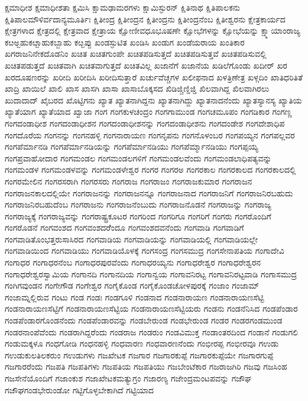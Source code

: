 {ಕ್ಷಮಾಧೀಶ
ಕ್ಷಮಾಧೀಶತಾ
ಕ್ಷಮಿಸಿ
ಕ್ಷಾಮಢಾಮರಗಳು
ಕ್ಷಾಮಿಸ್ಫುರನ್
ಕ್ಷಿತಿನಾಥ
ಕ್ಷಿತಿಪಾಲಕನು
ಕ್ಷಿತಿಪಾಲಮೌಳಿರ್ವದಾನ್ಯಮೂರ್ತಿಃ
ಕ್ಷಿತೀಂದ್ರ
ಕ್ಷಿತೀಂದ್ರನ
ಕ್ಷಿತೀಂದ್ರನು
ಕ್ಷಿತೀಂದ್ರನೆಂಬ
ಕ್ಷಿತೀಶ್ವರನು
ಕ್ಷೇತ್ರಕಾರ್ಯದ
ಕ್ಷೇತ್ರಗಳಾದ
ಕ್ಷೇತ್ರದಲ್ಲಿ
ಕ್ಷೇತ್ರವಾದ
ಕ್ಷೇತ್ರಾಯ
ಕ್ಷೋಣೀವಧೂಭೂಷಣೇ
ಕ್ಷೋಭೆಗಳನ್ನು
ಕ್ಷೋಭೆಯನ್ನು
ಕ್ಷ್ಮಾಯಾಂರಾಜ್ಯ
ಕೞಅ್ಬಹುಕೞ್ಬಾಹುಕಬ್ಬಾಹು
ಕೞ್ಬಪ್ಪು
ಖಂಡಸ್ಫುಟಿತ
ಖಂಡಿಸಿ
ಖಂಡುಗ
ಖಂಡೆಯರಾಯ
ಖಂತಿಕಾರ
ಖಗರಾಜನಿನೇಕದೊಡನಿಂ
ಖಚಿತ
ಖಚಿತಗುಂಪೇ
ಖಚಿತಪಡಿಸುತ್ತದೆ
ಖಚಿತಪಡಿಸುತ್ತವೆ
ಖಚಿತಪಡಿಸುವಲ್ಲಿ
ಖಚಿತಪಡುತ್ತದೆ
ಖಚಿತವಾಗಿ
ಖಚಿತವಾಗುತ್ತದೆ
ಖಚಿತವಿಲ್ಲ
ಖಜಾನೆಗೆ
ಖಜಾನೆಯ
ಖಡಿಲೆಗೊಂಡು
ಖದೀರ್
ಖರ
ಖರದೂಷಣರನ್ನು
ಖರೀದಿ
ಖರೀದಿಸಿ
ಖರೀದಿಸುತ್ತಾರೆ
ಖರ್ಚುವೆಚ್ಚಗಳ
ಖಲೀಫನಾದ
ಖಳತ್ರಿಣೇತ್ರ
ಖಳ್ಗದಿಂ
ಖಾತಿಧರಿತಿತೆ
ಖಾದ್ರಿ
ಖಾಯಿಲೆ
ಖಾಲಿ
ಖಾಸ
ಖಾಸಗಿ
ಖಾಸಾ
ಖಾಸಾಬೊಕ್ಕಸದ
ಖಿಡಿಜ್ಚಿಣ್ಡಿಜ್ಡಿ
ಖಿಲವಾಗಿದ್ದ
ಖಿಲವಾಗಿರಲು
ಖುದಾದಾದ್
ಖೈಬರದ
ಖೊಟ್ಟಿಗನು
ಖ್ಯಾತ
ಖ್ಯಾತನಾಗಿದ್ದನು
ಖ್ಯಾತನಾಗಿದ್ದು
ಖ್ಯಾತನಾದನೆಂದು
ಖ್ಯಾತಸ್ಯಾನಸ್ಯ
ಖ್ಯಾತಿಯ
ಖ್ಯಾತೆಯಾಗ
ಖ್ಯಾತೆಯಾದ
ಖ್ವಾಜಾ
ಗಂಗ
ಗಂಗಕುಳಚಂದ್ರಂ
ಗಂಗಗಾಮುಂಡ
ಗಂಗಚಮೂಪಂ
ಗಂಗಡಿಕಾರ
ಗಂಗಣ್ಣ
ಗಂಗದಂಡಾಧೀಶ
ಗಂಗದಂಡಾಧೀಶನ
ಗಂಗದಂಡಾಧೀಶನನ್ನು
ಗಂಗದಂಡಾಧೀಶನು
ಗಂಗದಂಡೇಶ
ಗಂಗದೇಶಾಧಿಪ
ಗಂಗದೊರೆಯ
ಗಂಗನನ್ನು
ಗಂಗನಹಳ್ಳಿ
ಗಂಗನಾರಾಯಣ
ಗಂಗನೃಪನು
ಗಂಗನೊಳಂಬರ
ಗಂಗಪಯ್ಯನ
ಗಂಗಪಲ್ಲವರ
ಗಂಗಪೆರ್ಮಾನಡಿ
ಗಂಗಪೆರ್ಮಾನಡಿಯನ್ನು
ಗಂಗಪೆರ್ಮಾನಡಿಯು
ಗಂಗಪೆರ್ಮ್ಮಾನಡಿಯು
ಗಂಗಪ್ಪಯ್ಯ
ಗಂಗಪ್ರವಾಹೋದಾರ
ಗಂಗಮಂಡಲ
ಗಂಗಮಂಡಲಗಳಿಗೆ
ಗಂಗಮಂಡಲವೆಂದು
ಗಂಗಮಂಡಲಾಧಿಪತ್ಯವನ್ನು
ಗಂಗಮಂಡಳ
ಗಂಗಮಂಡಳವನ್ನು
ಗಂಗಮಂಡಳೇಶ್ವರ
ಗಂಗರ
ಗಂಗರಅ
ಗಂಗರಕಾಲ
ಗಂಗರಕಾಲದ
ಗಂಗರಕಾಲದಲ್ಲಿ
ಗಂಗರಮೇಲಿನ
ಗಂಗರಸರಾಗಿ
ಗಂಗರಸರು
ಗಂಗರಾಜ
ಗಂಗರಾಜಂ
ಗಂಗರಾಜಕುಮಾರ
ಗಂಗರಾಜನ
ಗಂಗರಾಜನಕಾಲದಲ್ಲಿಯೇ
ಗಂಗರಾಜನನ್ನು
ಗಂಗರಾಜನನ್ನೂ
ಗಂಗರಾಜನಾದ
ಗಂಗರಾಜನಿಗೆ
ಗಂಗರಾಜನಿರಬಹುದು
ಗಂಗರಾಜನಿರಬಹುದೆಂಬ
ಗಂಗರಾಜನು
ಗಂಗರಾಜನೆಂಬುದು
ಗಂಗರಾಜನೊಡನೆ
ಗಂಗರಾಜನ್ನು
ಗಂಗರಾಜ್ಯ
ಗಂಗರಾಜ್ಯಕ್ಕೆ
ಗಂಗರಾಜ್ಯವನ್ನು
ಗಂಗರಾಷ್ಟ್ರಕೂಟರ
ಗಂಗರಿಂದ
ಗಂಗರಿಗೂ
ಗಂಗರಿಗೆ
ಗಂಗರು
ಗಂಗರೊಂದಿಗೆ
ಗಂಗರೊಡನೆ
ಗಂಗವಂಶದ
ಗಂಗವಂಶದರೆೆಂದೂ
ಗಂಗವಂಶದವನೆಂದು
ಗಂಗವಾಡಿ
ಗಂಗವಾಡಿಗೆ
ಗಂಗವಾಡಿತೊಂಭತ್ತರುಸಾಸಿರದ
ಗಂಗವಾಡಿಯ
ಗಂಗವಾಡಿಯನ್ನು
ಗಂಗವಾಡಿಯಲ್ಲಿ
ಗಂಗವಾಡಿಯಲ್ಲೇ
ಗಂಗವಾಡಿಯಿಂದ
ಗಂಗವಾಡಿಯು
ಗಂಗವಾಡಿಯೊಳಕ್ಕೆ
ಗಂಗಸಂದ್ರ
ಗಂಗಸಮುದ್ರ
ಗಂಗಸೇನಾಪತಿಯ
ಗಂಗಾದೇವಿ
ಗಂಗಾಧರ
ಗಂಗಾಧರನೆಂಬ
ಗಂಗಾಧರಪುರವೆಂದು
ಗಂಗಾಧರಯ್ಯನು
ಗಂಗಾಧರೇಶ್ವರ
ಗಂಗಾಧರೇಶ್ವರನ
ಗಂಗಾಧರೇಶ್ವರಸ್ವಾಮಿಯ
ಗಂಗಾನದಿ
ಗಂಗಾನದಿಯ
ಗಂಗಾನ್ವಯ
ಗಂಗಾವನಿರಟ್ಟ
ಗಂಗಾವನಿರಟ್ಟವಾಡಿ
ಗಂಗಾಸಮುದ್ರ
ಗಂಗಿಗವುಂಡನ
ಗಂಗೇಗೌಡ
ಗಂಗೇಶ್ವರ
ಗಂಗೈಕೊಂಡ
ಗಂಗೈಕೊಂಡಚೋಳಪುರಕ್ಕೆ
ಗಂಜಾಂ
ಗಂಜಾಮ್
ಗಂಜಾಮ್ನಲ್ಲಿರುವ
ಗಂಟು
ಗಂಡ
ಗಂಡಃ
ಗಂಡಗೂಳಿ
ಗಂಡನಾದ
ಗಂಡನಾರಾಯಣ
ಗಂಡನಾರಾಯಣಸೆಟ್ಟಿ
ಗಂಡನಾರಾಯಣಸೆಟ್ಟಿಗೆ
ಗಂಡನಾರಾಯಣಸೆಟ್ಟಿಯ
ಗಂಡನಾರಾಯಣಸೆಟ್ಟಿಯರು
ಗಂಡನು
ಗಂಡನೆನಿಸಿದ
ಗಂಡಪೆಂಡಾರ
ಗಂಡಪೆಂಡಾರಗೊಂಡನೆಂದು
ಗಂಡಪೆಂಡಾರವನ್ನು
ಗಂಡಬೇರುಂಡ
ಗಂಡಭೇರುಂಡ
ಗಂಡರ
ಗಂಡರಗಂಡಮುಂಡ
ಗಂಡರನಾಂಪೆವೆಂದು
ಗಂಡರಾಗಿದ್ದರೆಂದು
ಗಂಡರಾಜ
ಗಂಡರುಂ
ಗಂಡವಿಮುಕ್ತ
ಗಂಡಾಂತರದಿಂದ
ಗಂಡಾನೆ
ಗಂಡುಗಲಿ
ಗಂಡುಮಕ್ಕಳೂ
ಗಂಧಗೋಡಿ
ಗಂಧನಹಳ್ಳಿ
ಗಂಧವಾರಣ
ಗಂಧವಾರಣನೆಂದು
ಗಂಭೀರಪ್ಪ
ಗಂಭೀರವೂ
ಗಉಡು
ಗಉಡುಕುಲತಿಲಕರುಂ
ಗಉಡುಗಳು
ಗಜಖೇಟಕ
ಗಜಗಾರ
ಗಜಗಾರಕುಪ್ಪೆ
ಗಜಗಾರಕುಪ್ಪೆಯೇ
ಗಜಗಾರಗುಪ್ಪೆ
ಗಜಗಾರರೆಂದು
ಗಜಪತಿ
ಗಜಪತಿಗಳು
ಗಜಪತಿಯ
ಗಜಪತಿಯು
ಗಜಬೇಂಟೆಕಾರ
ಗಜರಾಜಗಿರಿ
ಗಜವು
ಗಜಸಿಂಹ
ಗಜಸೇನೆಯೊಂದಿಗೆ
ಗಜಾಂಕುಶ
ಗಜಾಖೇಟಕಮತ್ಯುಗ್ರಂ
ಗಜಾರಣ್ಯ
ಗಜೇಂದ್ರಮಂಟಪವನ್ನು
ಗಜೌಘ
ಗಜೌಘಗಂಡಭೇರುಂಡೋ
ಗಟ್ಟಿಗೊಳ್ಳಬೇಕಾಗಿದೆ
ಗಟ್ಟಿಯಾದ
}
